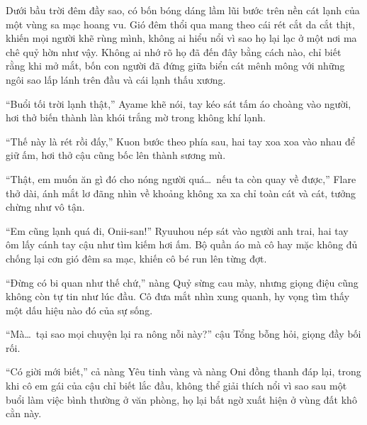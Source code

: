 \documentclass[../main.tex]{subfiles}
\begin{document}

Dưới bầu trời đêm đầy sao, có bốn bóng dáng lầm lũi bước trên nền cát lạnh của một vùng sa mạc hoang vu. Gió đêm thổi qua mang theo cái rét cắt da cắt thịt, khiến mọi người khẽ rùng mình, không ai hiểu nổi vì sao họ lại lạc ở một nơi ma chê quỷ hờn như vậy. Không ai nhớ rõ họ đã đến đây bằng cách nào, chỉ biết rằng khi mở mắt, bốn con người đã đứng giữa biển cát mênh mông với những ngôi sao lấp lánh trên đầu và cái lạnh thấu xương.


``Buổi tối trời lạnh thật,'' Ayame khẽ nói, tay kéo sát tấm áo choàng vào người, hơi thở biến thành làn khói trắng mờ trong không khí lạnh.

``Thế này là rét rồi đấy,'' Kuon bước theo phía sau, hai tay xoa xoa vào nhau để giữ ấm, hơi thở cậu cũng bốc lên thành sương mù.

``Thật, em muốn ăn gì đó cho nóng người quá\dots\ nếu ta còn quay về được,'' Flare thở dài, ánh mắt lơ đãng nhìn về khoảng không xa xa chỉ toàn cát và cát, tưởng chừng như vô tận.

``Em cũng lạnh quá đi, Onii-san!'' Ryuuhou nép sát vào người anh trai, hai tay ôm lấy cánh tay cậu như tìm kiếm hơi ấm. Bộ quần áo mà cô hay mặc không đủ chống lại cơn gió đêm sa mạc, khiến cô bé run lên từng đợt.

``Đừng có bi quan như thế chứ,'' nàng Quỷ sừng cau mày, nhưng giọng điệu cũng không còn tự tin như lúc đầu. Cô đưa mắt nhìn xung quanh, hy vọng tìm thấy một dấu hiệu nào đó của sự sống.

``Mà\dots\ tại sao mọi chuyện lại ra nông nỗi này?'' cậu Tổng bỗng hỏi, giọng đầy bối rối.

``Có giời mới biết,'' cả nàng Yêu tinh vàng và nàng Oni đồng thanh đáp lại, trong khi cô em gái của cậu chỉ biết lắc đầu, không thể giải thích nổi vì sao sau một buổi làm việc bình thường ở văn phòng, họ lại bất ngờ xuất hiện ở vùng đất khô cằn này.
\end{document}
